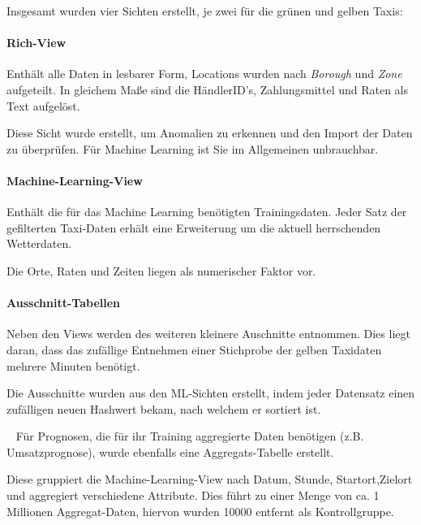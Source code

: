 Insgesamt wurden vier Sichten erstellt, je zwei für die grünen und gelben Taxis:

\paragraph{Rich-View}
Enthält alle Daten in lesbarer Form, Locations wurden nach \textit{Borough} und \textit{Zone} aufgeteilt. In gleichem Maße sind die HändlerID's, Zahlungsmittel und Raten als Text aufgelöst.

Diese Sicht wurde erstellt, um Anomalien zu erkennen und den Import der Daten zu überprüfen. Für Machine Learning ist Sie im Allgemeinen unbrauchbar. 

\paragraph{Machine-Learning-View}
Enthält die für das Machine Learning benötigten Trainingsdaten. Jeder Satz der gefilterten Taxi-Daten erhält eine Erweiterung um die aktuell herrschenden Wetterdaten. 

Die Orte, Raten und Zeiten liegen als numerischer Faktor vor. 

\paragraph{Ausschnitt-Tabellen}
Neben den Views werden des weiteren kleinere Auschnitte entnommen. Dies liegt daran, dass das zufällige Entnehmen einer Stichprobe der gelben Taxidaten mehrere Minuten benötigt. 

Die Ausschnitte wurden aus den ML-Sichten erstellt, indem jeder Datensatz einen zufälligen neuen Hashwert bekam, nach welchem er sortiert ist. 

~\newline
Für Prognosen, die für ihr Training aggregierte Daten benötigen (z.B. Umsatzprognose), wurde ebenfalls eine Aggregats-Tabelle erstellt. 

Diese gruppiert die Machine-Learning-View nach Datum, Stunde, Startort,Zielort und aggregiert verschiedene Attribute. Dies führt zu einer Menge von ca. 1 Millionen Aggregat-Daten, hiervon wurden 10000 entfernt als Kontrollgruppe.